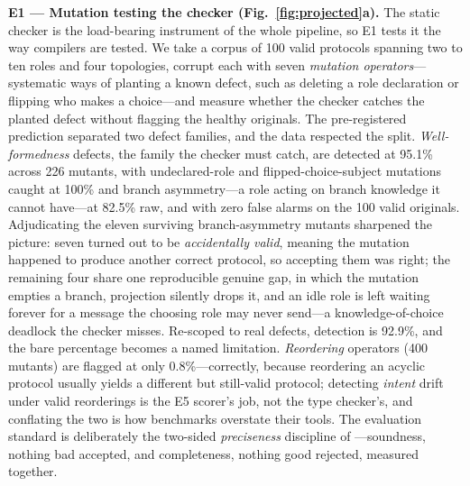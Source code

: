 \documentclass{article}
\begin{document}
\textbf{E1 --- Mutation testing the checker (Fig.~\ref{fig:projected}a).} The static checker is the load-bearing instrument of the whole pipeline, so E1 tests it the way compilers are tested. We take a corpus of 100 valid protocols spanning two to ten roles and four topologies, corrupt each with seven \emph{mutation operators}---systematic ways of planting a known defect, such as deleting a role declaration or flipping who makes a choice---and measure whether the checker catches the planted defect without flagging the healthy originals. The pre-registered prediction separated two defect families, and the data respected the split. \emph{Well-formedness} defects, the family the checker must catch, are detected at 95.1\% across 226 mutants, with undeclared-role and flipped-choice-subject mutations caught at 100\% and branch asymmetry---a role acting on branch knowledge it cannot have---at 82.5\% raw, and with zero false alarms on the 100 valid originals. Adjudicating the eleven surviving branch-asymmetry mutants sharpened the picture: seven turned out to be \emph{accidentally valid}, meaning the mutation happened to produce another correct protocol, so accepting them was right; the remaining four share one reproducible genuine gap, in which the mutation empties a branch, projection silently drops it, and an idle role is left waiting forever for a message the choosing role may never send---a knowledge-of-choice deadlock the checker misses. Re-scoped to real defects, detection is 92.9\%, and the bare percentage becomes a named limitation. \emph{Reordering} operators (400 mutants) are flagged at only 0.8\%---correctly, because reordering an acyclic protocol usually yields a different but still-valid protocol; detecting \emph{intent} drift under valid reorderings is the E5 scorer's job, not the type checker's, and conflating the two is how benchmarks overstate their tools. The evaluation standard is deliberately the two-sided \emph{preciseness} discipline of \citet{chen17,chen24}---soundness, nothing bad accepted, and completeness, nothing good rejected, measured together.
\end{document}
